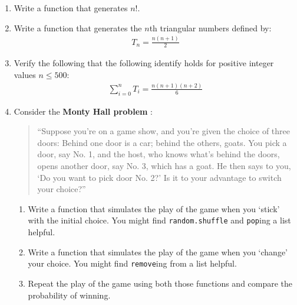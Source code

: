 \begin{enumerate}

\item 

Write a function that generates \(n!\).

\item 

Write a function that generates the \(n\)th triangular numbers defined by:
\begin{equation*}
\begin{split}
       T_n = \frac{n(n+1)}{2}
   \end{split}
\end{equation*}
\item 

Verify the following that the following identify holds for positive integer
values \(n\leq 500\):
\begin{equation*}
\begin{split}
       \sum_{i=0}^n T_i = \frac{n(n+1)(n+2)}{6}
   \end{split}
\end{equation*}
\item 

Consider the \textbf{Monty Hall problem} \cite{selvin1975monty}:

\begin{quote}
``Suppose you're on a game show, and you're given the choice of three doors:
Behind one door is a car; behind the others, goats. You pick a door, say No. 1,
and the host, who knows what's behind the doors, opens another door, say No. 3,
which has a goat. He then says to you, `Do you want to pick door No. 2?' Is it
to your advantage to switch your choice?''
\end{quote}

\begin{enumerate}

\item 

Write a function that simulates the play of the game when you ‘stick’ with
the initial choice. You might find \texttt{random.shuffle} and \texttt{pop}ing a list
helpful.

\item 

Write a function that simulates the play of the game when you ‘change’
your choice. You might find \texttt{remove}ing from a list helpful.

\item 

Repeat the play of the game using both those functions and compare the
probability of winning.

\end{enumerate}

\end{enumerate}




